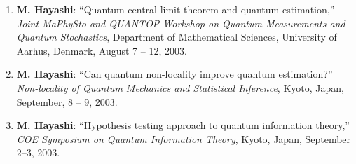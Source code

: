 \documentclass[a4paper,12pt,oneside]{article}
\begin{document}
\begin{enumerate}
\item
\textbf{M. Hayashi}: ``Quantum central limit theorem and quantum estimation,'' 
{\em Joint MaPhySto and QUANTOP Workshop on Quantum Measurements and Quantum Stochastics}, 
Department of Mathematical Sciences, University of Aarhus, Denmark, August 7 -- 12, 2003.

\item
\textbf{M. Hayashi}: ``Can quantum non-locality improve quantum estimation?'' 
{\em Non-locality of Quantum Mechanics and Statistical Inference}, Kyoto, 
Japan, September, 8 -- 9, 2003.

\item
\textbf{M. Hayashi}: ``Hypothesis testing approach to quantum information theory,'' 
{\em COE Symposium on Quantum Information Theory}, Kyoto, Japan, September 2--3, 2003.

\end{enumerate}
\end{document}
